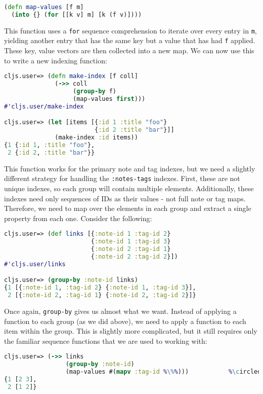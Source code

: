 \documentclass[10pt,twoside,openright]{memoir}
\newcommand*\circled[1]{\tikz[baseline=(char.base)]{
            \node[shape=circle,draw,inner sep=1pt] (char) {#1};}}
\begin{document}
\begin{lstlisting}[language=Clojure]
(defn map-values [f m]
  (into {} (for [[k v] m] [k (f v)])))
\end{lstlisting}

This function uses a \texttt{for} sequence comprehension to iterate over
every entry in \texttt{m}, yielding another entry that has the same key
but a value that has had \texttt{f} applied. These key, value vectors
are then collected into a new map. We can now use this to write a new
indexing function:

\begin{lstlisting}[language=Clojure]
cljs.user=> (defn make-index [f coll]
              (->> coll
                   (group-by f)
                   (map-values first)))
#'cljs.user/make-index

cljs.user=> (let [items [{:id 1 :title "foo"}
                         {:id 2 :title "bar"}]]
              (make-index :id items))
{1 {:id 1, :title "foo"},
 2 {:id 2, :title "bar"}}
\end{lstlisting}

This function works for the primary note and tag indexes, but we need a
slightly different strategy for handling the \texttt{:notes-tags}
indexes. First, these are not unique indexes, so each group will contain
multiple elements. Additionally, these indexes need only sequences of
IDs as their values - not full note or tag maps. Therefore, we need to
map over the elements in each group and extract a single property from
each one. Consider the following:

\begin{lstlisting}[language=Clojure]
cljs.user=> (def links [{:note-id 1 :tag-id 2}
                        {:note-id 1 :tag-id 3}
                        {:note-id 2 :tag-id 1}
                        {:note-id 2 :tag-id 2}])
#'cljs.user/links

cljs.user=> (group-by :note-id links)
{1 [{:note-id 1, :tag-id 2} {:note-id 1, :tag-id 3}],
 2 [{:note-id 2, :tag-id 1} {:note-id 2, :tag-id 2}]}
\end{lstlisting}

Once again, \texttt{group-by} gives us almost what we want. Instead of
applying a function to each group (as we did above), we need to apply a
function to each item within the group. This is slightly more
complicated, but it still requires only the familiar sequence functions
that we are used to working with:

\begin{lstlisting}[language=Clojure]
cljs.user=> (->> links
                 (group-by :note-id)
                 (map-values #(mapv :tag-id %\%%)))           %\circled{1}%
{1 [2 3],
 2 [1 2]}
\end{lstlisting}
\end{document}
